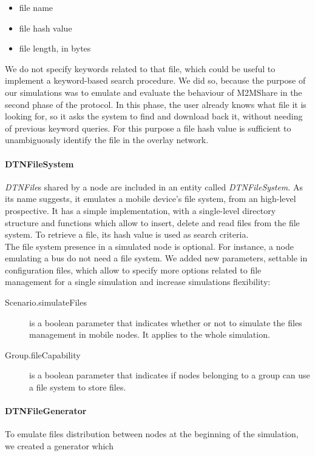 \begin{itemize}
\item file name
\item file hash value
\item file length, in bytes
\end{itemize}

We do not specify keywords related to that file, which could be useful to implement a keyword-based search procedure. We did so, because the purpose of our simulations was to emulate and evaluate the behaviour of M2MShare in the second phase of the protocol. In this phase, the user already knows what file it is looking for, so it asks the system to find and download back it, without needing of previous keyword queries. For this purpose a file hash value is sufficient to unambiguously identify the file in the overlay network.


\paragraph{DTNFileSystem}
\textit{DTNFile}s shared by a node are included in an entity called \textit{DTNFileSystem}. As its name suggests, it emulates a mobile device's file system, from an high-level prospective. It has a simple implementation, with a single-level directory structure and functions which allow to insert, delete and read files from the file system. To retrieve a file, its hash value is used as search criteria.
\\

The file system presence in a simulated node is optional. For instance, a node emulating a bus do not need a file system. We added new parameters, settable in configuration files, which allow to specify more options related to file management for a single simulation and increase simulations flexibility: 

\begin{description}
\item[Scenario.simulateFiles] is a boolean parameter that indicates whether or not to simulate the files management in mobile nodes. It applies to the whole simulation.
\item[Group.fileCapability] is a boolean parameter that indicates if nodes belonging to a group can use a file system to store files.
\end{description}

\paragraph{DTNFileGenerator}
\label{fileGeneratorImplementazione}
To emulate files distribution between nodes at the beginning of the simulation, we created a generator which 

